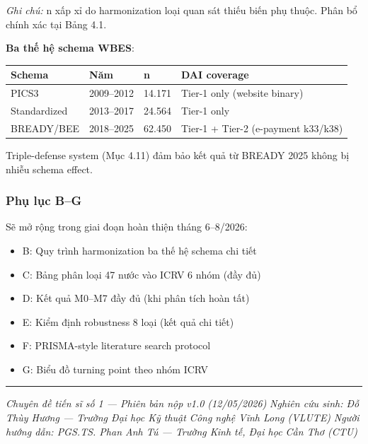 \documentclass[12pt,a4paper]{article}
\providecommand{\tightlist}{\setlength{\itemsep}{0pt}\setlength{\parskip}{0pt}}
\begin{document}
\emph{Ghi chú:} n xấp xỉ do harmonization loại quan sát thiếu biến phụ
thuộc. Phân bổ chính xác tại Bảng 4.1.

\textbf{Ba thế hệ schema WBES}:

\begin{longtable}[]{@{}llll@{}}
\toprule\noalign{}
Schema & Năm & n & DAI coverage \\
\midrule\noalign{}
\endhead
\bottomrule\noalign{}
\endlastfoot
PICS3 & 2009--2012 & 14.171 & Tier-1 only (website binary) \\
Standardized & 2013--2017 & 24.564 & Tier-1 only \\
BREADY/BEE & 2018--2025 & 62.450 & Tier-1 + Tier-2 (e-payment
k33/k38) \\
\end{longtable}

Triple-defense system (Mục 4.11) đảm bảo kết quả từ BREADY 2025 không bị
nhiễu schema effect.

\hypertarget{phux1ee5-lux1ee5c-bg}{%
\subsubsection{Phụ lục B--G}\label{phux1ee5-lux1ee5c-bg}}

Sẽ mở rộng trong giai đoạn hoàn thiện tháng 6--8/2026:

\begin{itemize}
\tightlist
\item
  B: Quy trình harmonization ba thế hệ schema chi tiết
\item
  C: Bảng phân loại 47 nước vào ICRV 6 nhóm (đầy đủ)
\item
  D: Kết quả M0--M7 đầy đủ (khi phân tích hoàn tất)
\item
  E: Kiểm định robustness 8 loại (kết quả chi tiết)
\item
  F: PRISMA-style literature search protocol
\item
  G: Biểu đồ turning point theo nhóm ICRV
\end{itemize}

\begin{center}\rule{0.5\linewidth}{0.5pt}\end{center}

\emph{Chuyên đề tiến sĩ số 1 --- Phiên bản nộp v1.0 (12/05/2026)}
\emph{Nghiên cứu sinh: Đỗ Thùy Hương --- Trường Đại học Kỹ thuật Công
nghệ Vĩnh Long (VLUTE)} \emph{Người hướng dẫn: PGS.TS. Phan Anh Tú ---
Trường Kinh tế, Đại học Cần Thơ (CTU)}
\end{document}
